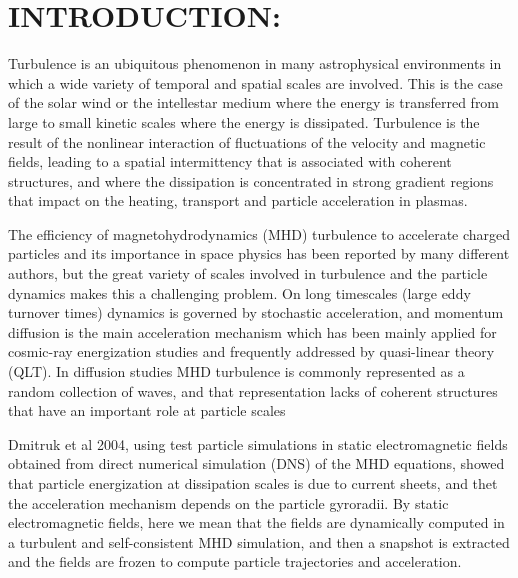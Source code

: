 \documentclass[%
aip,pop,amsmath,amssymb,
 reprint,%
]{revtex4-1}
\begin{document}
%

\section{\label{sec:level1}INTRODUCTION:}
Turbulence is an ubiquitous phenomenon in many astrophysical 
environments in which a wide  
variety of temporal and spatial scales are involved. This is the case of 
the solar wind or the 
intellestar medium where the energy is transferred from 
large to small kinetic scales where the energy is dissipated. 
Turbulence is the result of the  nonlinear 
interaction of fluctuations of the velocity and magnetic fields, 
leading to a spatial intermittency that is associated with coherent structures,
and where the dissipation is concentrated in strong gradient regions that impact on the
 heating, transport and particle acceleration in plasmas\cite{M1}.

The efficiency of magnetohydrodynamics (MHD) turbulence to accelerate charged particles 
and its importance in space 
physics has been reported by many different authors\cite{F1,L1,M2}, 
but the great variety of 
scales involved in turbulence and the particle dynamics
makes this a challenging problem.
On long timescales (large eddy turnover times) dynamics is
governed by stochastic acceleration, and momentum diffusion is
the main acceleration 
mechanism which has been mainly applied for cosmic-ray energization 
studies and frequently
addressed by quasi-linear theory (QLT)\cite{S1,CH1,Lange1}. 
In diffusion studies 
MHD turbulence is commonly represented as a random 
collection of waves, and that 
representation lacks of coherent structures that have an important role 
at particle scales\cite{Vlahos}

Dmitruk et al 2004\cite{PD1}, 
using test particle simulations in static electromagnetic fields obtained 
from direct numerical simulation (DNS) of the MHD equations, showed that particle 
energization at dissipation scales is due to current sheets, and thet the acceleration
mechanism depends on the particle gyroradii. By static electromagnetic fields, here we mean
that the fields are dynamically computed in a turbulent and self-consistent MHD simulation,
and then a snapshot is extracted and the fields are frozen to compute particle trajectories
and acceleration.
\end{document}
